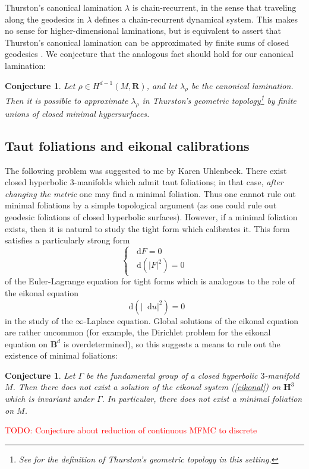 \documentclass[reqno,11pt]{amsart}
\newcommand{\RR}{\mathbf{R}}
\newcommand{\Hyp}{\mathbf H}
\newcommand{\Ball}{\mathbf{B}}
\newcommand*\dif{\mathop{}\!\mathrm{d}}
\newtheorem{conjecture}[theorem]{Conjecture}
\theoremstyle{definition}
\numberwithin{equation}{section}
\newcommand\todo[1]{\textcolor{red}{TODO: #1}}
\begin{document}
Thurston's canonical lamination $\lambda$ is chain-recurrent, in the sense that traveling along the geodesics in $\lambda$ defines a chain-recurrent dynamical system.
This makes no sense for higher-dimensional laminations, but is equivalent to assert that Thurston's canonical lamination can be approximated by finite sums of closed geodesics \cite[\S9]{Gu_ritaud_2017}.
We conjecture that the analogous fact should hold for our canonical lamination:

\begin{conjecture}\label{chain recurrence}
Let $\rho \in H^{d - 1}(M, \RR)$, and let $\lambda_\rho$ be the canonical lamination.
Then it is possible to approximate $\lambda_\rho$ in Thurston's geometric topology\footnote{See \cite[\S1]{BackusCML} for the definition of Thurston's geometric topology in this setting.} by finite unions of closed minimal hypersurfaces.
\end{conjecture}

\subsection{Taut foliations and eikonal calibrations}
The following problem was suggested to me by Karen Uhlenbeck. 
There exist closed hyperbolic $3$-manifolds which admit taut foliations; in that case, \emph{after changing the metric} one may find a minimal foliation.
Thus one cannot rule out minimal foliations by a simple topological argument (as one could rule out geodesic foliations of closed hyperbolic surfaces).
However, if a minimal foliation exists, then it is natural to study the tight form which calibrates it.
This form satisfies a particularly strong form 
\begin{equation}\label{eikonal}
\begin{cases}\dif F = 0 \\ \dif(|F|^2) = 0\end{cases}
\end{equation}
of the Euler-Lagrange equation for tight forms which is analogous to the role of the eikonal equation
$$\dif(|\dif u|^2) = 0$$
in the study of the $\infty$-Laplace equation.
Global solutions of the eikonal equation are rather uncommon (for example, the Dirichlet problem for the eikonal equation on $\Ball^d$ is overdetermined), so this suggests a means to rule out the existence of minimal foliations:

\begin{conjecture}\label{Karen}
Let $\Gamma$ be the fundamental group of a closed hyperbolic $3$-manifold $M$.
Then there does not exist a solution of the eikonal system (\ref{eikonal}) on $\Hyp^3$ which is invariant under $\Gamma$.
In particular, there does not exist a minimal foliation on $M$.
\end{conjecture}

\todo{Conjecture about reduction of continuous MFMC to discrete}




\printbibliography
\end{document}

